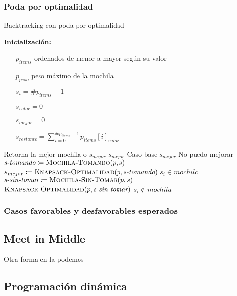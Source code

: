 \documentclass[fleqn, 11pt]{article}
\def\is{\coloneqq}
\begin{document}
\subsubsection{Poda por optimalidad}
\begin{algorithm}
\caption{Backtracking con poda por optimalidad}
\begin{algorithmic}[1]
\item[\textbf{Inicialización:}]
\item[] \begin{itemize}
	\item[] $p_{items}$ ordenados de menor a mayor según su valor
	\item[] $p_{peso}$ peso máximo de la mochila
	\item[] $s_i = \#p_{items} - 1$
	\item[] $s_{valor} = 0$
	\item[] $s_{mejor} = 0$
	\item[] $s_{restante} = \sum_{i = 0}^{\#p_{items} - 1} p_{items}[i]_{valor}$
\end{itemize}
\Statex
{}
\Comment Retorna la mejor mochila o $s_{mejor}$
	\State \Return $s_{mejor}$
	\Comment Caso base
\EndIf
{}
	\State \Return $s_{mejor}$
	\Comment No puedo mejorar
\EndIf
{}
	\State $\textit{s-tomando} \is \Call{Mochila-Tomando}{p, s}$
	\State $s_{mejor} \is \Call{Knapsack-Optimalidad}{p, \textit{s-tomando}}$
	\Comment $s_i \in mochila$
\EndIf
\State $\textit{s-sin-tomar} \is \Call{Mochila-Sin-Tomar}{p, s}$
\State \Return $\Call{Knapsack-Optimalidad}{p, \textit{s-sin-tomar}}$
\Comment $s_i \not\in mochila$
\EndFunction
\end{algorithmic}
\end{algorithm}

\subsubsection{Casos favorables y desfavorables esperados}

\subsection{Meet in Middle}

Otra forma en la podemos


\subsection{Programación dinámica}
\end{document}
